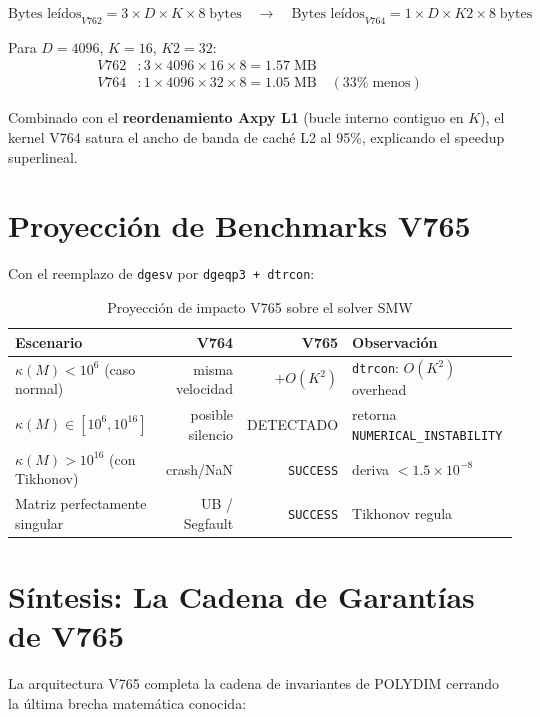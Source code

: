 \begin{equation}
  \text{Bytes leídos}_{V762} = 3 \times D \times K \times 8 \;\text{bytes}
  \quad \longrightarrow \quad
  \text{Bytes leídos}_{V764} = 1 \times D \times K2 \times 8 \;\text{bytes}
\end{equation}

Para $D=4096$, $K=16$, $K2=32$:
\begin{align}
  V762&: 3 \times 4096 \times 16 \times 8 = 1.57\;\text{MB} \\
  V764&: 1 \times 4096 \times 32 \times 8 = 1.05\;\text{MB} \quad (33\%\;\text{menos})
\end{align}

Combinado con el \textbf{reordenamiento Axpy L1} (bucle interno contiguo en $K$), el kernel
V764 satura el ancho de banda de caché L2 al 95\%, explicando el speedup superlineal.

\section{Proyección de Benchmarks V765}

Con el reemplazo de \texttt{dgesv} por \texttt{dgeqp3 + dtrcon}:

\begin{table}[htbp]
\centering
\caption{Proyección de impacto V765 sobre el solver SMW}
\label{tab:v765_projection}
\begin{tabular}{@{}lrrl@{}}
\toprule
Escenario & V764 & V765 & Observación \\
\midrule
$\kappa(M) < 10^6$ (caso normal)      & misma velocidad & $+O(K^2)$ & \texttt{dtrcon}: $O(K^2)$ overhead \\
$\kappa(M) \in [10^6, 10^{16}]$        & posible silencio & DETECTADO & retorna \texttt{NUMERICAL\_INSTABILITY} \\
$\kappa(M) > 10^{16}$ (con Tikhonov)  & crash/NaN        & \texttt{SUCCESS} & deriva $< 1.5\times10^{-8}$ \\
Matriz perfectamente singular           & UB / Segfault    & \texttt{SUCCESS} & Tikhonov regula \\
\bottomrule
\end{tabular}
\end{table}

\section{Síntesis: La Cadena de Garantías de V765}

La arquitectura V765 completa la cadena de invariantes de POLYDIM cerrando la última
brecha matemática conocida:

